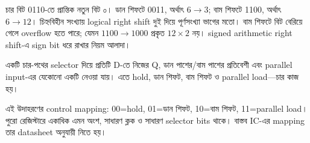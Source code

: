 চার বিট 0110-তে প্রান্তিক নতুন বিট ০।
\chThreeAnswer ডান শিফটে 0011, অর্থাৎ $6\to3$; বাম শিফটে 1100, অর্থাৎ $6\to12$। চিহ্নবিহীন সংখ্যায় logical right shift দুই দিয়ে পূর্ণসংখ্যা ভাগের মতো। বাম শিফটে বিট বেরিয়ে গেলে overflow হতে পারে; যেমন $1100\to1000$ প্রকৃত $12\times2$ নয়। signed arithmetic right shift-এ sign bit ধরে রাখার নিয়ম আলাদা।

একটি চার-পথের selector দিয়ে প্রতিটি D-তে নিজের Q, ডান পাশের/বাম পাশের প্রতিবেশী এবং parallel input-এর যেকোনো একটি নেওয়া যায়। এতে hold, ডান শিফট, বাম শিফট ও parallel load—চার কাজ হয়।
\begin{center}
\begin{minipage}{\linewidth}\centering\begin{chThreeDiagram}\end{chThreeDiagram}

\end{minipage}
\end{center}
এই উদাহরণের control mapping: 00=hold, 01=ডান শিফট, 10=বাম শিফট, 11=parallel load। পুরো রেজিস্টারে একাধিক এমন অংশ, সাধারণ ক্লক ও সাধারণ selector bits থাকে। বাস্তব IC-এর mapping তার datasheet অনুযায়ী নিতে হয়।
